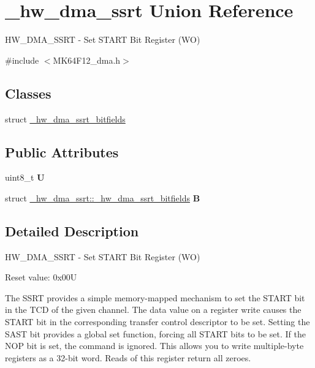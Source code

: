 \hypertarget{union__hw__dma__ssrt}{}\section{\+\_\+hw\+\_\+dma\+\_\+ssrt Union Reference}
\label{union__hw__dma__ssrt}


H\+W\+\_\+\+D\+M\+A\+\_\+\+S\+S\+RT -\/ Set S\+T\+A\+RT Bit Register (WO)  




{\ttfamily \#include $<$M\+K64\+F12\+\_\+dma.\+h$>$}

\subsection*{Classes}
\begin{DoxyCompactItemize}
\item 
struct \hyperlink{struct__hw__dma__ssrt_1_1__hw__dma__ssrt__bitfields}{\+\_\+hw\+\_\+dma\+\_\+ssrt\+\_\+bitfields}
\end{DoxyCompactItemize}
\subsection*{Public Attributes}
\begin{DoxyCompactItemize}
\item 
uint8\+\_\+t {\bfseries U}\hypertarget{union__hw__dma__ssrt_a03724777217c5b924bd63914f85601ca}{}\label{union__hw__dma__ssrt_a03724777217c5b924bd63914f85601ca}

\item 
struct \hyperlink{struct__hw__dma__ssrt_1_1__hw__dma__ssrt__bitfields}{\+\_\+hw\+\_\+dma\+\_\+ssrt\+::\+\_\+hw\+\_\+dma\+\_\+ssrt\+\_\+bitfields} {\bfseries B}\hypertarget{union__hw__dma__ssrt_a61e4075b0bd3308d7f285378b1b09a75}{}\label{union__hw__dma__ssrt_a61e4075b0bd3308d7f285378b1b09a75}

\end{DoxyCompactItemize}


\subsection{Detailed Description}
H\+W\+\_\+\+D\+M\+A\+\_\+\+S\+S\+RT -\/ Set S\+T\+A\+RT Bit Register (WO) 

Reset value\+: 0x00U

The S\+S\+RT provides a simple memory-\/mapped mechanism to set the S\+T\+A\+RT bit in the T\+CD of the given channel. The data value on a register write causes the S\+T\+A\+RT bit in the corresponding transfer control descriptor to be set. Setting the S\+A\+ST bit provides a global set function, forcing all S\+T\+A\+RT bits to be set. If the N\+OP bit is set, the command is ignored. This allows you to write multiple-\/byte registers as a 32-\/bit word. Reads of this register return all zeroes. 

